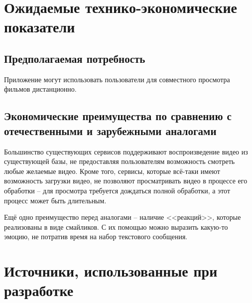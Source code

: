 \documentclass{../includes/TechDoc}
\begin{document}
    \section{Ожидаемые технико-экономические показатели}

    \subsection{Предполагаемая потребность}

    Приложение могут использовать пользователи для совместного просмотра фильмов дистанционно.

    \subsection{Экономические преимущества по сравнению с отечественными и зарубежными аналогами}

    Большинство существующих сервисов поддерживают воспроизведение видео из существующей базы, не предоставляя пользователям возможность смотреть любые желаемые видео.
    Кроме того, сервисы, которые всё-таки имеют возможность загрузки видео, не позволяют просматривать видео в процессе его обработки -- для просмотра требуется дождаться полной обработки, а этот процесс может быть длительным.

    Ещё одно преимущество перед аналогами -- наличие <<реакций>>, которые реализованы в виде смайликов.
    С их помощью можно выразить какую-то эмоцию, не потратив время на набор текстового сообщения.

    \clearpage


    \section{Источники, использованные при разработке}
\end{document}
